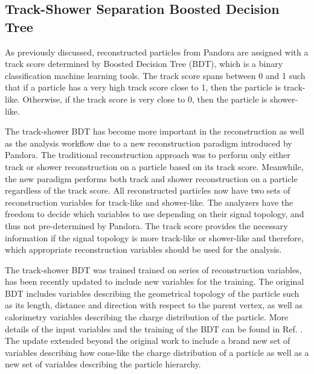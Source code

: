 \subsection{Track-Shower Separation Boosted Decision Tree}
\label{sec:trkshwbdt}
As previously discussed, reconstructed particles from Pandora are assigned with a track score determined by Boosted Decision Tree (BDT), which is a binary classification machine learning tools.
The track score spans between 0 and 1 such that if a particle has a very high track score close to 1, then the particle is track-like.
Otherwise, if the track score is very close to 0, then the particle is shower-like.

The track-shower BDT has become more important in the reconstruction as well as the analysis workflow due to a new reconstruction paradigm introduced by Pandora.
The traditional reconstruction approach was to perform only either track or shower reconstruction on a particle based on its track score.
Meanwhile, the new paradigm performs both track and shower reconstruction on a particle regardless of the track score.
All reconstructed particles now have two sets of reconstruction variables for track-like and shower-like.
The analyzers have the freedom to decide which variables to use depending on their signal topology, and thus not pre-determined by Pandora.
The track score provides the necessary information if the signal topology is more track-like or shower-like and therefore, which appropriate reconstruction variables should be used for the analysis. 

The track-shower BDT was trained trained on series of reconstruction variables, has been recently updated to include new variables for the training.
The original BDT includes variables describing the geometrical topology of the particle such as its length, distance and direction with respect to the parent vertex, as well as calorimetry variables describing the charge distribution of the particle.
More details of the input variables and the training of the BDT can be found in Ref. \cite{EdPhD}.
The update extended beyond the original work to include a brand new set of variables describing how cone-like the charge distribution of a particle as well as a new set of variables describing the particle hierarchy.

